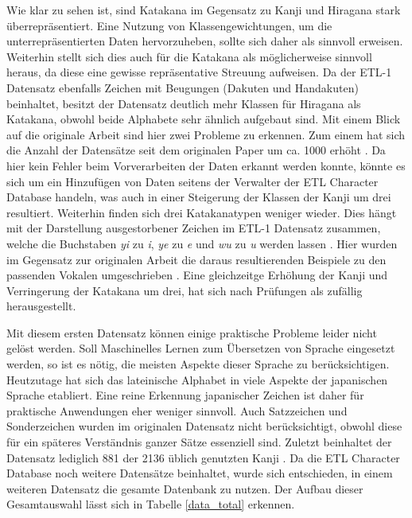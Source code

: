 \documentclass[twoside,a4paper]{IEEEtran}
\begin{document}
Wie klar zu sehen ist, sind Katakana im Gegensatz zu Kanji und Hiragana stark überrepräsentiert. Eine Nutzung von Klassengewichtungen, um die unterrepräsentierten Daten hervorzuheben, sollte sich daher als sinnvoll erweisen. Weiterhin stellt sich dies auch für die Katakana als möglicherweise sinnvoll heraus, da diese eine gewisse repräsentative Streuung aufweisen. Da der ETL-1 Datensatz ebenfalls Zeichen mit Beugungen (Dakuten und Handakuten) beinhaltet, besitzt der Datensatz deutlich mehr Klassen für Hiragana als Katakana, obwohl beide Alphabete sehr ähnlich aufgebaut sind. Mit einem Blick auf die originale Arbeit sind hier zwei Probleme zu erkennen. Zum einem hat sich die Anzahl der Datensätze seit dem originalen Paper um ca. 1000 erhöht \cite[S.3]{RHC}. Da hier kein Fehler beim Vorverarbeiten der Daten erkannt werden konnte, könnte es sich um ein Hinzufügen von Daten seitens der Verwalter der ETL Character Database handeln, was auch in einer Steigerung der Klassen der Kanji um drei resultiert. Weiterhin finden sich drei Katakanatypen weniger wieder. Dies hängt mit der Darstellung ausgestorbener Zeichen im ETL-1 Datensatz zusammen, welche die Buchstaben \textit{yi} zu \textit{i}, \textit{ye} zu \textit{e} und \textit{wu} zu \textit{u} werden lassen \cite{ETL}. Hier wurden im Gegensatz zur originalen Arbeit die daraus resultierenden Beispiele zu den passenden Vokalen umgeschrieben \cite[S.3]{RHC}. Eine gleichzeitge Erhöhung der Kanji und Verringerung der Katakana um drei, hat sich nach Prüfungen als zufällig herausgestellt. 

Mit diesem ersten Datensatz können einige praktische Probleme leider nicht gelöst werden. Soll Maschinelles Lernen zum Übersetzen von Sprache eingesetzt werden, so ist es nötig, die meisten Aspekte dieser Sprache zu berücksichtigen. Heutzutage hat sich das lateinische Alphabet in viele Aspekte der japanischen Sprache etabliert. Eine reine Erkennung japanischer Zeichen ist daher für praktische Anwendungen eher weniger sinnvoll. Auch Satzzeichen und Sonderzeichen wurden im originalen Datensatz nicht berücksichtigt, obwohl diese für ein späteres Verständnis ganzer Sätze essenziell sind. Zuletzt beinhaltet der Datensatz lediglich 881 der 2136 üblich genutzten Kanji \cite[S.3]{RHC}. Da die ETL Character Database noch weitere Datensätze beinhaltet, wurde sich entschieden, in einem weiteren Datensatz die gesamte Datenbank zu nutzen. Der Aufbau dieser Gesamtauswahl lässt sich in Tabelle \ref{data_total} erkennen.
\end{document}
